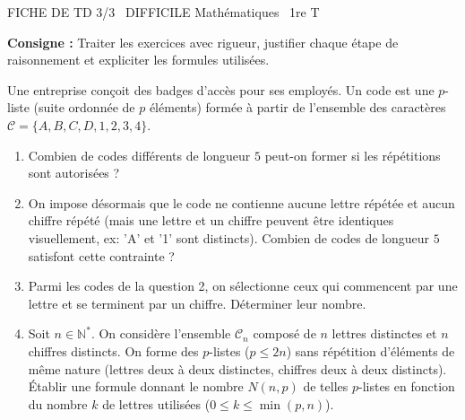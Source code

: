 \documentclass[11pt]{article}
\begin{document}
\begin{tcolorbox}[enhanced,colback=popink,colframe=popink,arc=10pt,boxrule=0pt,left=12pt,right=12pt,top=9pt,bottom=9pt]
{\color{white}\popxbold\small FICHE DE TD 3/3 \textbullet\ DIFFICILE \hfill Mathématiques \textbullet\ 1re T\par}
\end{tcolorbox}
\vspace{4pt}
\noindent\textbf{Consigne :} Traiter les exercices avec rigueur, justifier chaque étape de raisonnement et expliciter les formules utilisées.

\begin{exercice}
Une entreprise conçoit des badges d'accès pour ses employés. Un code est une $p$-liste (suite ordonnée de $p$ éléments) formée à partir de l'ensemble des caractères $\mathcal{C} = \{A, B, C, D, 1, 2, 3, 4\}$.
\begin{enumerate}
    \item Combien de codes différents de longueur $5$ peut-on former si les répétitions sont autorisées ?
    \item On impose désormais que le code ne contienne aucune lettre répétée et aucun chiffre répété (mais une lettre et un chiffre peuvent être identiques visuellement, ex: 'A' et '1' sont distincts). Combien de codes de longueur $5$ satisfont cette contrainte ?
    \item Parmi les codes de la question 2, on sélectionne ceux qui commencent par une lettre et se terminent par un chiffre. Déterminer leur nombre.
    \item Soit $n \in \mathbb{N}^*$. On considère l'ensemble $\mathcal{C}_n$ composé de $n$ lettres distinctes et $n$ chiffres distincts. On forme des $p$-listes ($p \le 2n$) sans répétition d'éléments de même nature (lettres deux à deux distinctes, chiffres deux à deux distincts). Établir une formule donnant le nombre $N(n,p)$ de telles $p$-listes en fonction du nombre $k$ de lettres utilisées ($0 \le k \le \min(p,n)$).
\end{enumerate}
\end{exercice}
\end{document}
